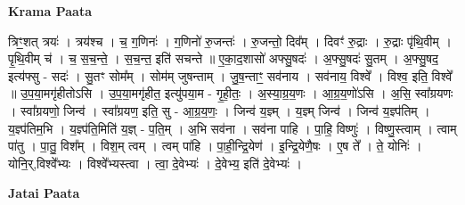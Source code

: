 \documentclass[17pt]{extarticle}
\begin{document}
\textbf{Krama Paata} \newline

त्रिꣳ॒॒शत् त्रयः॑ । त्रय॑श्च । च॒ ग॒णिनः॑ । ग॒णिनो॑ रु॒जन्तः॑ । रु॒जन्तो॒ दिव᳚म् । दिवꣳ॑ रु॒द्राः । रु॒द्राः पृ॑थि॒वीम् । पृ॒थि॒वीम् च॑ । च॒ स॒च॒न्ते॒ । स॒च॒न्त॒ इति॑ सचन्ते ॥ ए॒का॒द॒शासो॑ अफ्सु॒षदः॑ । अ॒फ्सु॒षदः॑ सु॒तम् । अ॒फ्सु॒षद॒ इत्य॑फ्सु - सदः॑ । सु॒तꣳ सोम᳚म् । सोम॑म् जुषन्ताम् । जु॒ष॒न्ताꣳ॒॒ सव॑नाय । सव॑नाय॒ विश्वे᳚ । विश्व॒ इति॒ विश्वे᳚ ॥ उ॒प॒या॒मगृ॑हीतोऽसि । उ॒प॒या॒मगृ॑हीत॒ इत्यु॑पया॒म - गृ॒ही॒तः॒ । अ॒स्या॒ग्र॒य॒णः । आ॒ग्र॒य॒णो॑ऽसि । अ॒सि॒ स्वा᳚ग्रयणः । स्वा᳚ग्रयणो॒ जिन्व॑ । स्वा᳚ग्रयण॒ इति॒ सु - आ॒ग्र॒य॒णः॒ । जिन्व॑ य॒ज्ञ्म् । य॒ज्ञ्म् जिन्व॑ । जिन्व॑ य॒ज्ञ्प॑तिम् । य॒ज्ञ्प॑तिम॒भि । य॒ज्ञ्प॑ति॒मिति॑ य॒ज्ञ् - प॒ति॒म् । अ॒भि सव॑ना । सव॑ना पाहि । पा॒हि॒ विष्णुः॑ । विष्णु॒स्त्वाम् । त्वाम् पा॑तु । पा॒तु॒ विश᳚म् । विश॒म् त्वम् । त्वम् पा॑हि । पा॒ही॒न्द्रि॒येण॑ । इ॒न्द्रि॒येणै॒षः । ए॒ष ते᳚ । ते॒ योनिः॑ । योनि॒र्,विश्वे᳚भ्यः । विश्वे᳚भ्यस्त्वा । त्वा॒ दे॒वेभ्यः॑ । दे॒वेभ्य॒ इति॑ दे॒वेभ्यः॑ । \newline

\textbf{Jatai Paata} \newline
\end{document}
